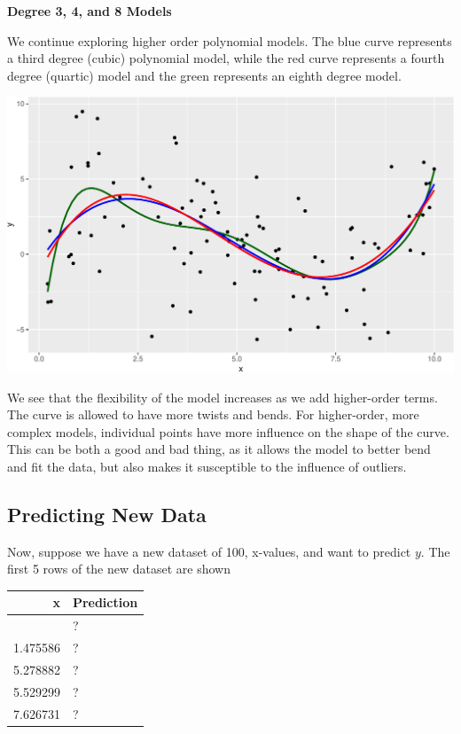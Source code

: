 \documentclass[
  letterpaper,
  DIV=11,
  numbers=noendperiod]{scrreprt}
\begin{document}
\textbf{Degree 3, 4, and 8 Models}

We continue exploring higher order polynomial models. The blue curve
represents a third degree (cubic) polynomial model, while the red curve
represents a fourth degree (quartic) model and the green represents an
eighth degree model.

\includegraphics{Ch7_files/figure-pdf/unnamed-chunk-9-1.pdf}

We see that the flexibility of the model increases as we add
higher-order terms. The curve is allowed to have more twists and bends.
For higher-order, more complex models, individual points have more
influence on the shape of the curve. This can be both a good and bad
thing, as it allows the model to better bend and fit the data, but also
makes it susceptible to the influence of outliers.

\subsection{Predicting New Data}\label{predicting-new-data}

Now, suppose we have a new dataset of 100, x-values, and want to predict
\(y\). The first 5 rows of the new dataset are shown

\begin{longtable}[]{@{}rl@{}}
\toprule\noalign{}
x & Prediction \\
\midrule\noalign{}
\endhead
\bottomrule\noalign{}
\endlastfoot
3.196237 & ? \\
1.475586 & ? \\
5.278882 & ? \\
5.529299 & ? \\
7.626731 & ? \\
\end{longtable}
\end{document}
